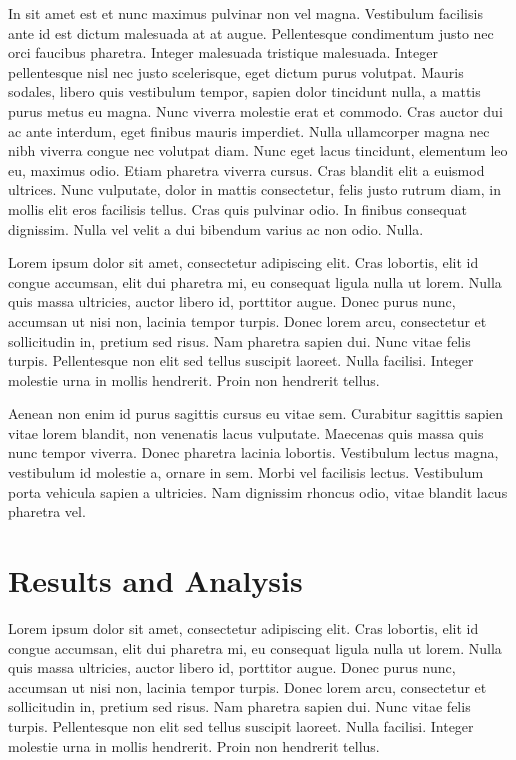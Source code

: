 \documentclass[a4paper]{article}
\begin{document}
In sit amet est et nunc maximus pulvinar non vel magna. Vestibulum facilisis ante id est dictum malesuada at at augue. Pellentesque condimentum justo nec orci faucibus pharetra. Integer malesuada tristique malesuada. Integer pellentesque nisl nec justo scelerisque, eget dictum purus volutpat. Mauris sodales, libero quis vestibulum tempor, sapien dolor tincidunt nulla, a mattis purus metus eu magna. Nunc viverra molestie erat et commodo. Cras auctor dui ac ante interdum, eget finibus mauris imperdiet. Nulla ullamcorper magna nec nibh viverra congue nec volutpat diam. Nunc eget lacus tincidunt, elementum leo eu, maximus odio. Etiam pharetra viverra cursus. Cras blandit elit a euismod ultrices. Nunc vulputate, dolor in mattis consectetur, felis justo rutrum diam, in mollis elit eros facilisis tellus. Cras quis pulvinar odio. In finibus consequat dignissim. Nulla vel velit a dui bibendum varius ac non odio. Nulla.

Lorem ipsum dolor sit amet, consectetur adipiscing elit. Cras lobortis, elit id congue accumsan, elit dui pharetra mi, eu consequat ligula nulla ut lorem. Nulla quis massa ultricies, auctor libero id, porttitor augue. Donec purus nunc, accumsan ut nisi non, lacinia tempor turpis. Donec lorem arcu, consectetur et sollicitudin in, pretium sed risus. Nam pharetra sapien dui. Nunc vitae felis turpis. Pellentesque non elit sed tellus suscipit laoreet. Nulla facilisi. Integer molestie urna in mollis hendrerit. Proin non hendrerit tellus.

Aenean non enim id purus sagittis cursus eu vitae sem. Curabitur sagittis sapien vitae lorem blandit, non venenatis lacus vulputate. Maecenas quis massa quis nunc tempor viverra. Donec pharetra lacinia lobortis. Vestibulum lectus magna, vestibulum id molestie a, ornare in sem. Morbi vel facilisis lectus. Vestibulum porta vehicula sapien a ultricies. Nam dignissim rhoncus odio, vitae blandit lacus pharetra vel. 

\section{Results and Analysis}

%

Lorem ipsum dolor sit amet, consectetur adipiscing elit. Cras lobortis, elit id congue accumsan, elit dui pharetra mi, eu consequat ligula nulla ut lorem. Nulla quis massa ultricies, auctor libero id, porttitor augue. Donec purus nunc, accumsan ut nisi non, lacinia tempor turpis. Donec lorem arcu, consectetur et sollicitudin in, pretium sed risus. Nam pharetra sapien dui. Nunc vitae felis turpis. Pellentesque non elit sed tellus suscipit laoreet. Nulla facilisi. Integer molestie urna in mollis hendrerit. Proin non hendrerit tellus.
\end{document}

